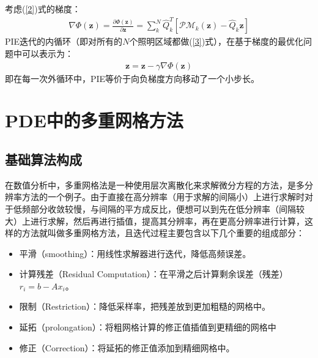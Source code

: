 \documentclass[10pt,aspectratio=169]{beamer} %
\renewcommand{\vec}[1]{\boldsymbol{#1}} %
\begin{document}
\begin{frame}
    考虑(\ref{2})式的梯度：
    \begin{align}
        \nabla  \Phi (\vec{z}) = \frac{\partial \Phi (\vec{z})}{\partial \vec{z}} = \sum_k^N \hat{Q}_k^T [\mathcal{PM}_k(\vec{z})-\hat{Q}_k \vec{z}]
    \end{align}
    PIE迭代的内循环（即对所有的$N$个照明区域都做(\ref{3})式），在基于梯度的最优化问题中可以表示为：
    \begin{align}
        \vec{z}=\vec{z}-\gamma \nabla \Phi (\vec{z})
    \end{align}
    即在每一次外循环中，PIE等价于向负梯度方向移动了一个小步长。
\end{frame}

\section{PDE中的多重网格方法}

\subsection{基础算法构成}

\begin{frame}
    在数值分析中，多重网格法是一种使用层次离散化来求解微分方程的方法，是多分辨率方法的一个例子。由于直接在高分辨率（用于求解的间隔小）上进行求解时对于低频部分收敛较慢，与间隔的平方成反比，便想可以到先在低分辨率（间隔较大）上进行求解，然后再进行插值，提高其分辨率，再在更高分辨率进行计算，这样的方法就叫做多重网格方法，且迭代过程主要包含以下几个重要的组成部分：
    \begin{itemize}
        \item 平滑（smoothing）：用线性求解器进行迭代，降低高频误差。
        \item 计算残差（Residual Computation）：在平滑之后计算剩余误差（残差）$r_i=b-Ax_i$。
        \item 限制（Restriction）：降低采样率，把残差放到更加粗糙的网格中。
        \item 延拓（prolongation）：将粗网格计算的修正值插值到更精细的网格中
        \item 修正（Correction）：将延拓的修正值添加到精细网格中。
    \end{itemize}
\end{frame}
\end{document}
